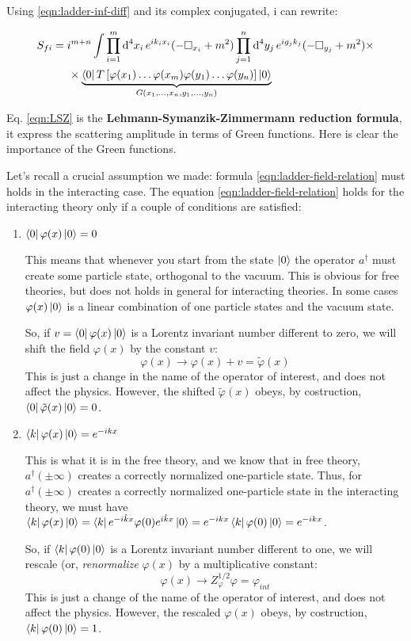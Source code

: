 \documentclass[../main/main.tex]{subfiles}
\let\temp\phi
\let\phi\varphi
\let\varphi\temp
\begin{document}
Using \eqref{eqn:ladder-inf-diff} and its complex conjugated, i can rewrite:
\begin{mdframed}[style=mybox]
\begin{equation}\label{eqn:LSZ}\begin{split}
S_{fi}
&=i^{m+n}\int
\prod_{i=1}^m\de^4x_i\,e^{ik_ix_i}(-\square_{x_i}+m^2)
\prod_{j=1}^n\de^4y_j\,e^{ig_jk_j}(-\square_{y_j}+m^2)\times\\
&\hspace{0.5cm}\times
\underbrace{\bra0 T\left[\phi(x_1)\dots\phi(x_m)\phi(y_1)\dots\phi(y_n)\right]\ket0}_{G(x_1,\dots,x_n,y_1,\dots,y_n)}
\end{split}\end{equation}
\end{mdframed}

Eq. \eqref{eqn:LSZ} is the \textbf{Lehmann-Symanzik-Zimmermann reduction formula}, it express the scattering amplitude in terms of Green functions. Here is clear the importance of the Green functions.

Let's recall a crucial assumption we made: formula \eqref {eqn:ladder-field-relation} must holds in the interacting case.
The equation  \eqref {eqn:ladder-field-relation} holds for the interacting theory only if a couple of conditions are satisfied:
\begin{enumerate}
\item $\bra0\phi(x)\ket0=0$

This means that whenever you start from the state $\ket0$ the operator $a^\dagger$ must create some particle state, orthogonal to the vacuum. This is obvious for free theories, but does not holds in general for interacting theories. In some cases $\phi(x)\ket0$ is a linear combination of one particle states and the vacuum state. 

So, if $v=\bra0\phi(x)\ket0$ is a Lorentz invariant number different to zero, we will shift the field $\phi(x)$ by the constant $v$:
\[\phi(x)\rightarrow\phi(x)+v=\tilde \phi(x)\]
This is just a change in the name of the operator of interest, and does not affect the physics. However, the shifted $\tilde\phi(x)$ obeys, by costruction, $\bra0\tilde\phi(x)\ket0=0$.
\item $\bra k\phi(x)\ket 0=e^{-ikx}$

This is what it is in the free theory, and we know that in free theory, $a^\dagger(\pm\infty)$ creates a correctly normalized one-particle state. Thus, for $a^\dagger(\pm\infty)$ creates a correctly normalized one-particle state in the interacting theory, we must have $\bra k\phi(x)\ket 0=\bra ke^{-i\hat kx}\phi(0)e^{i\hat kx}\ket0=e^{-ikx}\bra k\phi(0)\ket 0=e^{-ikx}$.

So, if $\bra k\phi(0)\ket 0$ is a Lorentz invariant number different to one, we will rescale (or, \emph{renormalize} $\phi(x)$ by a multiplicative constant:
\[\phi(x)\rightarrow Z_{\phi}^{1/2}\phi=\phi_{int}\]
 This is just a change of the name of the operator of interest, and does not affect the physics. However, the rescaled $\phi(x)$ obeys, by costruction, $\bra k\phi(0)\ket 0=1$.
\end{enumerate}
\end{document}
